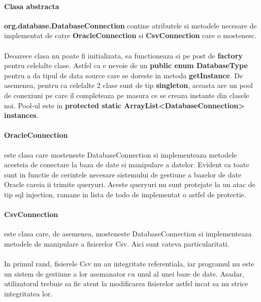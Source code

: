 \documentclass[oneside]{article}
\begin{document}
\paragraph{Clasa abstracta} \textbf{org.database.DatabaseConnection} contine atributele si metodele necesare de implementat de catre \textbf{OracleConnection} si \textbf{CsvConnection} care o mostenesc. 

\paragraph{} Deoarece clasa nu poate fi initializata, ea functioneaza si pe post de \textbf{factory} pentru celelalte clase. Astfel ca e nevoie de un \textbf{public enum DatabaseType} pentru a da tipul de data source care se doreste in metoda \textbf{getInstance}. De asemenea, pentru ca celelalte 2 clase sunt de tip \textbf{singleton}, aceasta are un pool de conexiuni pe care il completeaza pe masura ce se creaza instante din clasele noi. Pool-ul este in \textbf{protected static ArrayList<DatabaseConnection> instances}.

\paragraph{OracleConnection} este clasa care mosteneste DatabaseConnection si implementeaza metodele acesteia de conectare la baza de date si manipulare a datelor. Evident ca toate sunt in functie de cerintele necesare sistemului de gestiune a bazelor de date Oracle careia ii trimite queryuri. Aceste queryuri nu sunt protejate la un atac de tip sql injection, ramane in lista de todo de implementat o astfel de protectie.

\paragraph{CsvConnection} este clasa care, de asemenea, mosteneste DatabaseConnection si implementeaza metodele de manipulare a fisierelor Csv. Aici sunt cateva particularitati.

\paragraph{} In primul rand, fisierele Csv nu au integritate referentiala, iar programul nu este un sistem de gestiune a lor asemanator cu unul al unei baze de date. Asadar, utilizatorul trebuie sa fie atent la modificarea fisierelor astfel incat sa nu strice integritatea lor.
\end{document}
